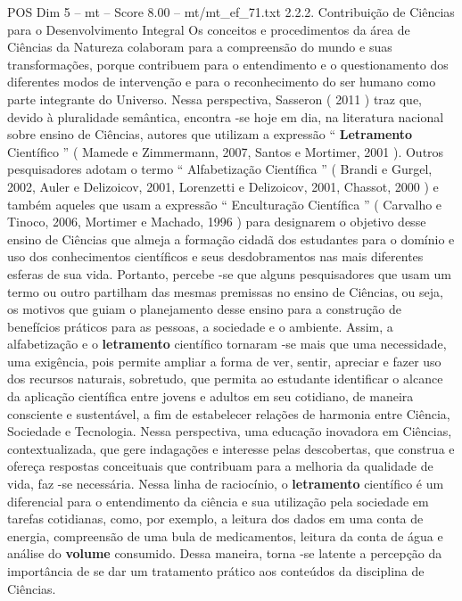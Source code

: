 \begin{textsample}{POS Dim 5 – mt – Score 8.00 – mt/mt\_ef\_71.txt}  \label{ex:f5_pos_087}
2.2.2.
Contribuição de Ciências para o Desenvolvimento Integral Os conceitos e procedimentos da área de Ciências da Natureza colaboram para a compreensão do mundo e suas transformações, porque contribuem para o entendimento e o questionamento dos diferentes modos de intervenção e para o reconhecimento do ser humano como parte integrante do Universo.
Nessa perspectiva, Sasseron ( 2011 ) traz que, devido à pluralidade semântica, encontra -se hoje em dia, na literatura nacional sobre ensino de Ciências, autores que utilizam a expressão “ \textbf{Letramento} Científico ” ( Mamede e Zimmermann, 2007, Santos e Mortimer, 2001 ).
Outros pesquisadores adotam o termo “ Alfabetização Científica ” ( Brandi e Gurgel, 2002, Auler e Delizoicov, 2001, Lorenzetti e Delizoicov, 2001, Chassot, 2000 ) e também aqueles que usam a expressão “ Enculturação Científica ” ( Carvalho e Tinoco, 2006, Mortimer e Machado, 1996 ) para designarem o objetivo desse ensino de Ciências que almeja a formação cidadã dos estudantes para o domínio e uso dos conhecimentos científicos e seus desdobramentos nas mais diferentes esferas de sua vida.
Portanto, percebe -se que alguns pesquisadores que usam um termo ou outro partilham das mesmas premissas no ensino de Ciências, ou seja, os motivos que guiam o planejamento desse ensino para a construção de benefícios práticos para as pessoas, a sociedade e o ambiente.
Assim, a alfabetização e o \textbf{letramento} científico tornaram -se mais que uma necessidade, uma exigência, pois permite ampliar a forma de ver, sentir, apreciar e fazer uso dos recursos naturais, sobretudo, que permita ao estudante identificar o alcance da aplicação científica entre jovens e adultos em seu cotidiano, de maneira consciente e sustentável, a fim de estabelecer relações de harmonia entre Ciência, Sociedade e Tecnologia.
Nessa perspectiva, uma educação inovadora em Ciências, contextualizada, que gere indagações e interesse pelas descobertas, que construa e ofereça respostas conceituais que contribuam para a melhoria da qualidade de vida, faz -se necessária.
Nessa linha de raciocínio, o \textbf{letramento} científico é um diferencial para o entendimento da ciência e sua utilização pela sociedade em tarefas cotidianas, como, por exemplo, a leitura dos dados em uma conta de energia, compreensão de uma bula de medicamentos, leitura da conta de água e análise do \textbf{volume} consumido.
Dessa maneira, torna -se latente a percepção da importância de se dar um tratamento prático aos conteúdos da disciplina de Ciências.

\end{textsample}
